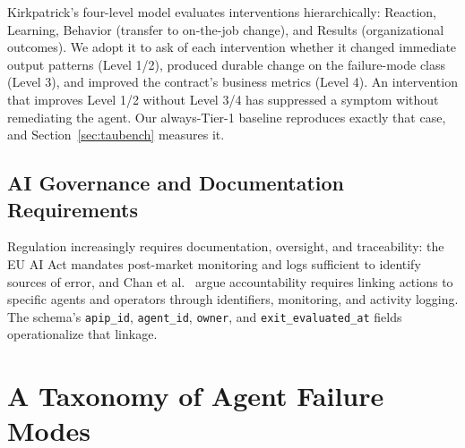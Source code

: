 \documentclass[conference]{IEEEtran}
\newcommand{\code}[1]{\texttt{\small #1}}
\begin{document}
Kirkpatrick's four-level model \cite{kirkpatrick1994, kirkpatrick2016}
evaluates interventions hierarchically: Reaction, Learning, Behavior (transfer
to on-the-job change), and Results (organizational outcomes). We adopt it to
ask of each intervention whether it changed immediate output patterns
(Level 1/2), produced durable change on the failure-mode class (Level 3), and
improved the contract's business metrics (Level 4). An intervention that
improves Level 1/2 without Level 3/4 has suppressed a symptom without
remediating the agent. Our always-Tier-1 baseline reproduces exactly that case,
and Section~\ref{sec:taubench} measures it.

\subsection{AI Governance and Documentation Requirements}
\label{sec:governance}

Regulation increasingly requires documentation, oversight, and traceability:
the EU AI Act \cite{euaiact} mandates post-market monitoring and logs
sufficient to identify sources of error, and Chan et al.\ \cite{chan2024} argue
accountability requires linking actions to specific agents and operators
through identifiers, monitoring, and activity logging. The schema's
\code{apip\_id}, \code{agent\_id}, \code{owner}, and \code{exit\_evaluated\_at}
fields operationalize that linkage.

\section{A Taxonomy of Agent Failure Modes}
\label{sec:taxonomy}
\end{document}
